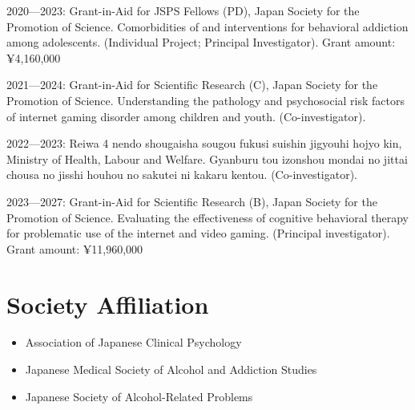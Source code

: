 \documentclass[a4paper]{article}
\begin{document}
\begin{description}
	\item 2020---2023: Grant-in-Aid for JSPS Fellows (PD), Japan Society for the Promotion of Science. Comorbidities of and interventions for behavioral addiction among adolescents. (Individual Project; Principal Investigator). Grant amount: ¥4,160,000
	\item 2021---2024: Grant-in-Aid for Scientific Research (C), Japan Society for the Promotion of Science. Understanding the pathology and psychosocial risk factors of internet gaming disorder among children and youth. (Co-investigator).
	\item 2022---2023: Reiwa 4 nendo shougaisha sougou fukusi suishin jigyouhi hojyo kin, Ministry of Health, Labour and Welfare. Gyanburu tou izonshou mondai no jittai chousa no jisshi houhou no sakutei ni kakaru kentou. (Co-investigator).
	\item 2023---2027: Grant-in-Aid for Scientific Research (B), Japan Society for the Promotion of Science. Evaluating the effectiveness of cognitive behavioral therapy for problematic use of the internet and video gaming. (Principal investigator). Grant amount: ¥11,960,000
	\end{description}

\section{Society Affiliation}
\begin{itemize}
	\item Association of Japanese Clinical Psychology
	\item Japanese Medical Society of Alcohol and Addiction Studies
	\item Japanese Society of Alcohol-Related Problems
\end{itemize}
\end{document}

